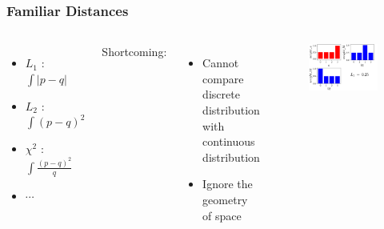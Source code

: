 \documentclass{beamer}
\begin{document}
\begin{frame}
\frametitle{Familiar Distances}
\begin{columns}
\begin{itemize}
    \item $L_{1}$ : $\int|p-q|$
    \item $L_{2}$ : $\int(p-q)^{2}$
    \item $\chi^{2}$ : $\int\frac{(p-q)^{2}}{q}$
    \item $\cdots$
\end{itemize}
Shortcoming:
\begin{itemize}
    \item Cannot compare discrete distribution with continuous distribution
    \item Ignore the geometry of space
\end{itemize}
\begin{figure}
    \centering
    \includegraphics[width=1.0\linewidth]{img/tab.png}
\end{figure}
\end{columns}
\end{frame}


\end{document}

